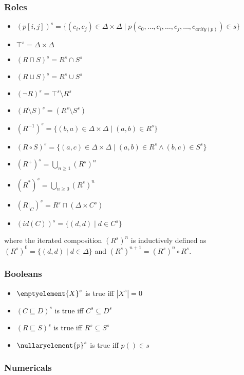 \documentclass{article}
\begin{document}
\subsubsection{Roles}

\begin{itemize}
    \item $(p[i,j])^s = \{(c_i,c_j)\in\Delta\times\Delta\mid p(c_0,\ldots,c_i,\ldots,c_j,\ldots,c_{\mathit{arity}(p)})\in s \}$
    \item $\top^s = \Delta\times\Delta$
    \item $(R\sqcap S)^s = R^s\cap S^s$
    \item $(R\sqcup S)^s = R^s\cup S^s$
    \item $(\neg R)^s = \top^s\setminus R^s$
    \item $(R\setminus S)^s = (R^s\setminus S^s)$
    \item $(R^{-1})^s = \{(b,a)\in\Delta\times\Delta\mid (a,b)\in R^s\}$
    \item $(R\circ S)^s = \{(a,c)\in\Delta\times\Delta\mid (a,b)\in R^s\land (b,c)\in S^s \}$
    \item $(R^+)^s = \bigcup_{n\geq 1}(R^s)^n$
    \item $(R^*)^s = \bigcup_{n\geq 0}(R^s)^n$
    \item $(R\vert_{C})^s = R^s\sqcap (\Delta\times C^s)$
    \item $(\mathit{id}(C))^s = \{(d,d)\mid d\in C^s \}$
\end{itemize}

where the iterated composition $(R^s)^n$ is inductively defined as
$(R^s)^0 = \{(d,d)\mid d\in\Delta\}$ and $(R^s)^{n+1} = (R^s)^n\circ R^s$.

\subsubsection{Booleans}

\begin{itemize}
    \item $\emptyelement{X}^s$ is true iff $|X^s| = 0$
    \item $(C\sqsubseteq D)^s$ is true iff $C^s\subseteq D^s$
    \item $(R\sqsubseteq S)^s$ is true iff $R^s\subseteq S^s$
    \item $\nullaryelement{p}^s$ is true iff $p()\in s$
\end{itemize}

\subsubsection{Numericals}
\end{document}
